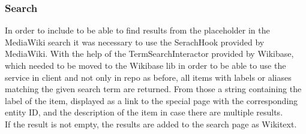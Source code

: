 \subsubsection{Search}
In order to include to be able to find results from the placeholder in the MediaWiki search it was necessary to use the SerachHook provided by MediaWiki.
With the help of the TermSearchInteractor provided by Wikibase, which needed to be moved to the Wikibase lib in order to be able to use the service in client and not only in repo as before, all items with labels or aliases matching the given search term are returned. From those a string containing the label of the item, displayed as a link to the special page with the corresponding entity ID, and the description of the item in case there are multiple results.  \\
If the result is not empty, the results are added to the search page as Wikitext. 
